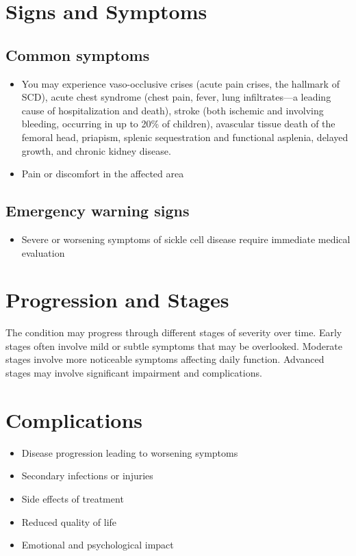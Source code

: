\section{Signs and Symptoms}

\subsection{Common symptoms}
\begin{itemize}[noitemsep]
  \item You may experience vaso-occlusive crises (acute pain crises, the hallmark of SCD), acute chest syndrome (chest pain, fever, lung infiltrates---a leading cause of hospitalization and death), stroke (both ischemic and involving bleeding, occurring in up to 20\% of children), avascular tissue death of the femoral head, priapism, splenic sequestration and functional asplenia, delayed growth, and chronic kidney disease.
  \item Pain or discomfort in the affected area
  \end{itemize}

\subsection{Emergency warning signs}
\begin{itemize}[noitemsep]
  \item Severe or worsening symptoms of sickle cell disease require immediate medical evaluation
\end{itemize}
\section{Progression and Stages}
The condition may progress through different stages of severity over time. Early stages often involve mild or subtle symptoms that may be overlooked. Moderate stages involve more noticeable symptoms affecting daily function. Advanced stages may involve significant impairment and complications.
\section{Complications}
\begin{itemize}[noitemsep]
  \item Disease progression leading to worsening symptoms
  \item Secondary infections or injuries
  \item Side effects of treatment
  \item Reduced quality of life
  \item Emotional and psychological impact
\end{itemize}
